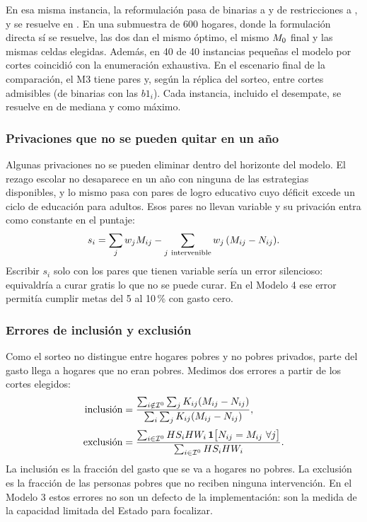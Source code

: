 En esa misma instancia, la reformulación pasa de \cBinDirecta{} binarias a
\cBinCortes{} y de \cRestrDirecta{} restricciones a \cRestrCortes{}, y se resuelve
en \cTiempoCortes{}. En una submuestra de 600 hogares, donde la formulación directa
sí se resuelve, las dos dan el mismo óptimo, el mismo $M_0$ final y las mismas
celdas elegidas. Además, en 40 de 40 instancias pequeñas el modelo por cortes
coincidió con la enumeración exhaustiva.
En el escenario final de la comparación, el M3 tiene
\cParesMtresFin{} pares y, según la réplica del sorteo, entre \cCortesMtresFin{}
cortes admisibles (de \cBinMtresFin{} binarias con las $b1_i$). Cada instancia,
incluido el desempate, se resuelve en \cTiempoMtresMed{} de mediana y
\cTiempoMtresMax{} como máximo.

\subsubsection{Privaciones que no se pueden quitar en un año}

Algunas privaciones no se pueden eliminar dentro del horizonte del modelo. El
rezago escolar no desaparece en un año con ninguna de las estrategias
disponibles, y lo mismo pasa con \cLogroFijos{} pares de logro educativo cuyo
déficit excede un ciclo de educación para adultos. Esos pares no llevan
variable y su privación entra como constante en el puntaje:
\[
s_i=\sum_{j} w_jM_{ij}-\sum_{j\ \text{intervenible}} w_j\,(M_{ij}-\Ndec_{ij}).
\]
Escribir $s_i$ solo con los pares que tienen variable sería un error silencioso:
equivaldría a curar gratis lo que no se puede curar. En el Modelo 4 ese error
permitía cumplir metas del 5 al 10\,\% con gasto cero.

\subsubsection{Errores de inclusión y exclusión}

Como el sorteo no distingue entre hogares pobres y no pobres privados, parte del
gasto llega a hogares que no eran pobres. Medimos dos errores a partir de los
cortes elegidos:
\begin{align}
\text{inclusión} &= \frac{\sum_{i\notin\mathcal{I}^0}\sum_j K_{ij}(M_{ij}-N_{ij})}
                         {\sum_{i}\sum_j K_{ij}(M_{ij}-N_{ij})},
\label{eq:inclusion}\\[2pt]
\text{exclusión} &= \frac{\sum_{i\in\mathcal{I}^0}HS_iHW_i\,
      \mathbf{1}\bigl[N_{ij}=M_{ij}\ \forall j\bigr]}
      {\sum_{i\in\mathcal{I}^0}HS_iHW_i}. \label{eq:exclusion}
\end{align}
La inclusión es la fracción del gasto que se va a hogares no pobres. La
exclusión es la fracción de las personas pobres que no reciben ninguna
intervención. En el Modelo 3 estos errores no son un defecto de la
implementación: son la medida de la capacidad limitada del Estado para
focalizar.

